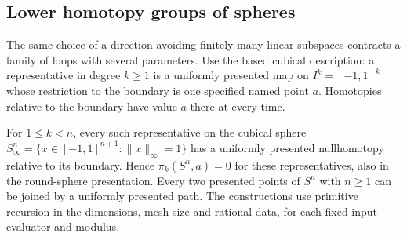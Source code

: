 \subsection{Lower homotopy groups of spheres}

The same choice of a direction avoiding finitely many linear subspaces
contracts a family of loops with several parameters. Use the based
cubical description: a representative in degree $k\ge1$ is a uniformly
presented map on $I^k=[-1,1]^k$ whose restriction to the boundary is one
specified named point $a$. Homotopies relative to the boundary have value
$a$ there at every time.

\begin{theorem}\label{idx-higher10}
For $1\le k<n$, every such representative on the cubical sphere
$S^n_\infty=\{x\in[-1,1]^{n+1}:\|x\|_\infty=1\}$ has a uniformly
presented nullhomotopy relative to its boundary. Hence
$\pi_k(S^n,a)=0$ for these representatives, also in the round-sphere
presentation. Every two presented points of $S^n$ with $n\ge1$ can be
joined by a uniformly presented path. The constructions use primitive
recursion in the dimensions, mesh size and rational data, for each fixed
input evaluator and modulus.
\end{theorem}
